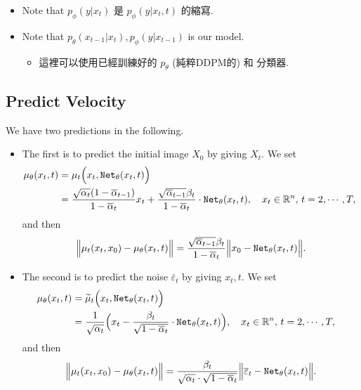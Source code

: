 \documentclass[
]{article}
\providecommand{\tightlist}{%
  \setlength{\itemsep}{0pt}\setlength{\parskip}{0pt}}\usepackage{longtable,booktabs,array}
\theoremstyle{remark}
\begin{document}
\begin{itemize}
\begin{itemize}
    \begin{itemize}
    \tightlist
    \item
      Note that \(p_{\phi}(y\vert x_t)\) 是 \(p_{\phi}(y\vert x_t,t)\)
      的縮寫.
    \item
      Note that
      \(p_{\theta}(x_{t-1}\vert x_{t}), p_{\phi}(y\vert x_{t-1})\) is
      our model.

      \begin{itemize}
      \tightlist
      \item
        這裡可以使用已經訓練好的 \(p_{\theta}\) (純粹DDPM的) 和 分類器.
      \end{itemize}
    \end{itemize}
  \end{itemize}
\end{itemize}

\subsection{Predict Velocity}\label{predict-velocity}

We have two predictions in the following.

\begin{itemize}
\item
  The first is to predict the initial image \(X_0\) by giving \(X_t.\)
  We set \[
  \begin{aligned}
    \mu_{\theta}(x_t,t) 
    &= \mu_t \Bigl( x_t, \mathtt{Net}_{\theta}(x_t,t) \Bigr) \cr
    &= \frac{\sqrt{\alpha_t}(1-\overline{\alpha}_{t-1})}{1-\overline{\alpha}_t}x_t + \frac{\sqrt{\overline{\alpha}_{t-1}}\beta_t}{1-\overline{\alpha}_t} \cdot \mathtt{Net}_{\theta}(x_t,t) , \quad x_t \in \mathbb R^n,\, t=2, \cdots, T,
  \end{aligned}
  \] and then \[
  \begin{aligned}
    \Bigl\lVert \mu_t(x_t,x_0)- \mu_{\theta}(x_t,t) \Bigr\rVert 
    = \frac{\sqrt{\overline{\alpha}_{t-1}}\beta_t}{1-\overline{\alpha}_t} \Bigl\lVert  x_0 - \mathtt{Net}_{\theta}(x_t,t) \Bigr\rVert.
  \end{aligned}
  \]
\item
  The second is to predict the noise \(\overline{\varepsilon}_t\) by
  giving \(x_t,t.\) We set \[
  \begin{aligned}
    \mu_{\theta}(x_t,t)
    &= \widetilde{\mu}_t \Bigl( x_t, \mathtt{Net}_{\theta}(x_t,t) \Bigr)  \cr
    &= \frac{1}{\sqrt{\alpha_t}} \Bigl( 
      x_t - \frac{\beta_t}{\sqrt{1-\overline{\alpha}_t}} \cdot \mathtt{Net}_{\theta}(x_t,t)
    \Bigr) , \quad x_t \in \mathbb R^n,\, t=2,\cdots, T,
  \end{aligned}
  \] and then \[
  \begin{aligned}
    \Bigl\lVert \mu_t(x_t,x_0)- \mu_{\theta}(x_t,t) \Bigr\rVert =  \frac{\beta_t}{\sqrt{\alpha_t}\cdot \sqrt{1-\overline{\alpha}_t}} \Bigl\lVert \overline{\varepsilon}_t - \mathtt{Net}_{\theta}(x_t,t)  \Bigr\rVert.
  \end{aligned}
  \]
\end{itemize}
\end{document}
